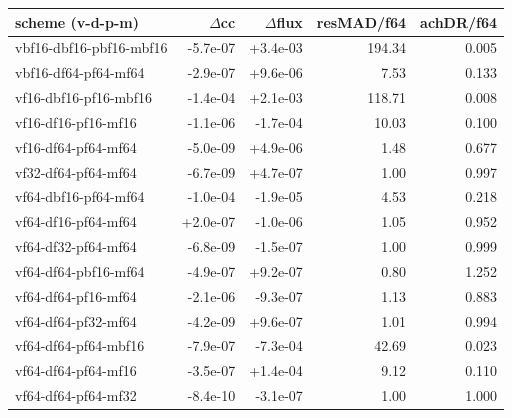 \begin{tabular}{lrrrr}
\toprule
scheme (v-d-p-m) & $\Delta$cc & $\Delta$flux & resMAD/f64 & achDR/f64 \\
\midrule
vbf16-dbf16-pbf16-mbf16 & -5.7e-07 & +3.4e-03 & 194.34 & 0.005 \\
vbf16-df64-pf64-mf64 & -2.9e-07 & +9.6e-06 & 7.53 & 0.133 \\
vf16-dbf16-pf16-mbf16 & -1.4e-04 & +2.1e-03 & 118.71 & 0.008 \\
vf16-df16-pf16-mf16 & -1.1e-06 & -1.7e-04 & 10.03 & 0.100 \\
vf16-df64-pf64-mf64 & -5.0e-09 & +4.9e-06 & 1.48 & 0.677 \\
vf32-df64-pf64-mf64 & -6.7e-09 & +4.7e-07 & 1.00 & 0.997 \\
vf64-dbf16-pf64-mf64 & -1.0e-04 & -1.9e-05 & 4.53 & 0.218 \\
vf64-df16-pf64-mf64 & +2.0e-07 & -1.0e-06 & 1.05 & 0.952 \\
vf64-df32-pf64-mf64 & -6.8e-09 & -1.5e-07 & 1.00 & 0.999 \\
vf64-df64-pbf16-mf64 & -4.9e-07 & +9.2e-07 & 0.80 & 1.252 \\
vf64-df64-pf16-mf64 & -2.1e-06 & -9.3e-07 & 1.13 & 0.883 \\
vf64-df64-pf32-mf64 & -4.2e-09 & +9.6e-07 & 1.01 & 0.994 \\
vf64-df64-pf64-mbf16 & -7.9e-07 & -7.3e-04 & 42.69 & 0.023 \\
vf64-df64-pf64-mf16 & -3.5e-07 & +1.4e-04 & 9.12 & 0.110 \\
vf64-df64-pf64-mf32 & -8.4e-10 & -3.1e-07 & 1.00 & 1.000 \\
\bottomrule
\end{tabular}